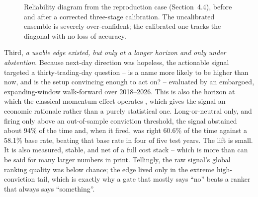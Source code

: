 \documentclass[10pt,a4paper,twocolumn]{article}
\begin{document}
\begin{figure}[tb]
\centering
{}
\caption{Reliability diagram from the reproduction case (Section~4.4), before and after a corrected three-stage calibration. The uncalibrated ensemble is severely over-confident; the calibrated one tracks the diagonal with no loss of accuracy.}
\label{fig:calib}
\end{figure}

Third, \textit{a usable edge existed, but only at a longer horizon and only under abstention}. Because next-day direction was hopeless, the actionable signal targeted a thirty-trading-day question -- is a name more likely to be higher than now, and is the setup convincing enough to act on? -- evaluated by an embargoed, expanding-window walk-forward over 2018--2026. This is also the horizon at which the classical momentum effect operates \cite{jegadeesh1993}, which gives the signal an economic rationale rather than a purely statistical one. Long-or-neutral only, and firing only above an out-of-sample conviction threshold, the signal abstained about 94\% of the time and, when it fired, was right 60.6\% of the time against a 58.1\% base rate, beating that base rate in four of five test years. The lift is small. It is also measured, stable, and net of a full cost stack -- which is more than can be said for many larger numbers in print. Tellingly, the raw signal's global ranking quality was below chance; the edge lived only in the extreme high-conviction tail, which is exactly why a gate that mostly says ``no'' beats a ranker that always says ``something''.
\end{document}

